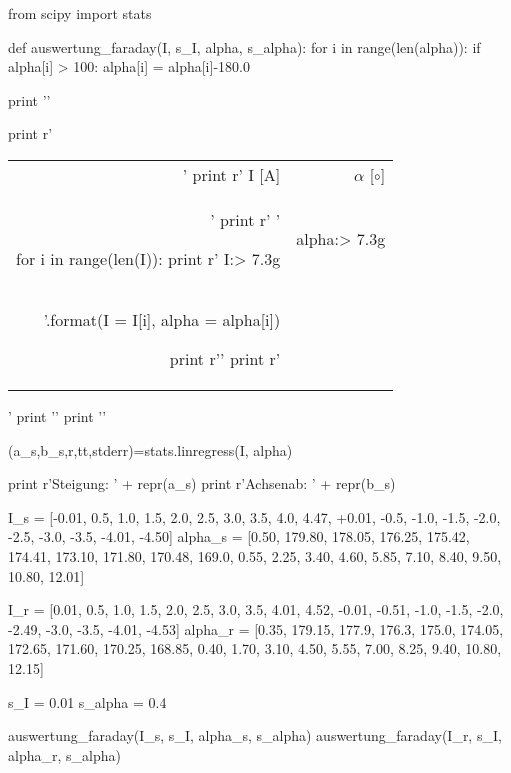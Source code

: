 \begin{python}
from scipy import stats

def auswertung_faraday(I, s_I, alpha, s_alpha):
  for i in range(len(alpha)):
    if alpha[i] > 100:
      alpha[i] = alpha[i]-180.0

  print '\n'

  print r'\begin{tabular}{rr} \toprule'
  print r' I [A] & $\alpha$ [$\circ$] \\'
  print r' \midrule '

  for i in range(len(I)):
    print r' {I:> 7.3g}  &  {alpha:> 7.3g} \\ '.format(I = I[i], alpha = alpha[i])

  print r'\bottomrule '
  print r'\end{tabular}'
  print '\n'
  print '\n'

  (a_s,b_s,r,tt,stderr)=stats.linregress(I, alpha)

  print r'Steigung: ' + repr(a_s)
  print r'Achsenab: ' + repr(b_s)


I_s = [-0.01, 0.5, 1.0, 1.5, 2.0, 2.5, 3.0, 3.5, 4.0, 4.47, +0.01, -0.5, -1.0, -1.5, -2.0, -2.5, -3.0, -3.5, -4.01, -4.50]
alpha_s = [0.50, 179.80, 178.05, 176.25, 175.42, 174.41, 173.10, 171.80, 170.48, 169.0, 0.55, 2.25, 3.40, 4.60, 5.85, 7.10, 8.40, 9.50, 10.80, 12.01]

I_r = [0.01, 0.5, 1.0, 1.5, 2.0, 2.5, 3.0, 3.5, 4.01, 4.52, -0.01, -0.51, -1.0, -1.5, -2.0, -2.49, -3.0, -3.5, -4.01, -4.53]
alpha_r = [0.35, 179.15, 177.9, 176.3, 175.0, 174.05, 172.65, 171.60, 170.25, 168.85, 0.40, 1.70, 3.10, 4.50, 5.55, 7.00, 8.25, 9.40, 10.80, 12.15]

s_I = 0.01
s_alpha = 0.4

auswertung_faraday(I_s, s_I, alpha_s, s_alpha)
auswertung_faraday(I_r, s_I, alpha_r, s_alpha)

\end{python}

